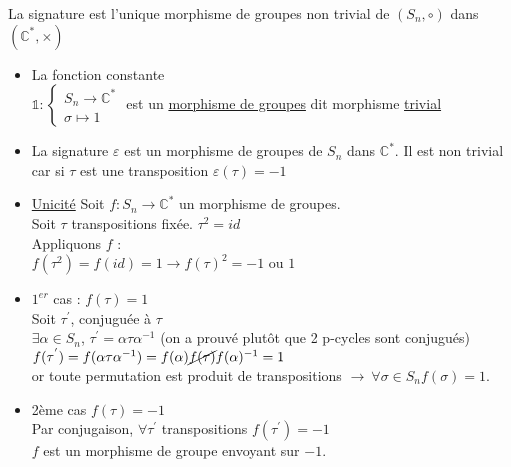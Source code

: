 \documentclass[11pt]{article}
\newcommand*{\C}{\mathbb{C}}
\newcommand*{\n}{\\[0.2cm]}
\newcommand{\0}{\varnothing}
\newcommand*{\e}{\varepsilon}
\newcommand*{\s}{\sigma}
\begin{document}
\begin{corr}{}{}
    La signature est l'unique morphisme de groupes non trivial de $(S_{n}, \circ)$ dans $(\C^{*}, \times)$
    \tcblower
    \begin{itemize}
        \item La fonction constante \n
        $\mathds{1} : \left\{ \begin{array}{ll}
             S_{n} \to \C^{*}  \\
             \s \mapsto 1
        \end{array}\right.$ est un \underline{morphisme de groupes} dit morphisme \underline{trivial}
        \item La signature $\e$ est un morphisme de groupes de $S_{n}$ dans $\C^{*}$. Il est non trivial car si $\tau$ est une transposition $\e(\tau) = -1$
        \item \underline{Unicité} Soit $f : S_{n} \to \C^{*}$ un morphisme de groupes.\n
        Soit $\tau$ transpositions fixée. $\tau^{2} = id$\n
        Appliquons $f$ :\n
        $f(\tau^{2}) = f(id) = 1 \rightarrow f(\tau)^{2} = -1$ ou $1$
        \item $1^{er}$ cas : $f(\tau) = 1$\n
        Soit $\tau^{'}$, conjuguée à $\tau$\n 
        $\exists \alpha \in S_{n}$, $\tau^{'} = \alpha \tau \alpha^{-1}$ (on a prouvé plutôt que 2 p-cycles sont conjugués)\n
        $f(\tau^{'}) = f(\alpha \tau \alpha^{-1}) = f(\alpha) \cancel{f(\tau)} f(\alpha)^{-1} = 1$\n
        or toute permutation est produit de transpositions $\rightarrow ~ \forall \s \in S_{n} f(\s) = 1$.
        \item 2ème cas $f(\tau) = -1$\n
        Par conjugaison, $\forall \tau^{'}$ transpositions $f(\tau^{'}) = -1$\n
        $f$ est un morphisme de groupe envoyant sur $-1$.
    \end{itemize}
\end{corr}
\end{document}
